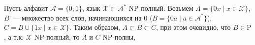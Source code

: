 \begin{task}{6}
Пусть алфавит $\mathcal{A} = \{0, 1\}$, язык $\mathcal{X} \subset \mathcal{A}^*$ NP-полный. Возьмем $A = \{0x \mid x \in \mathcal{X}\}$, $B$~--- множество всех слов, начинающихся на $0$ ($B = \{0a \mid a \in \mathcal{A}^*\}$), $C = B \cup \{1x \mid x \in \mathcal{X}\}$. Таким образом, $A \subset B \subset C$, при этом очевидно, что $B \in \text{P}$, а т.к. $\mathcal{X}$ NP-полный, то $A$ и $C$ NP-полны, 
\end{task}